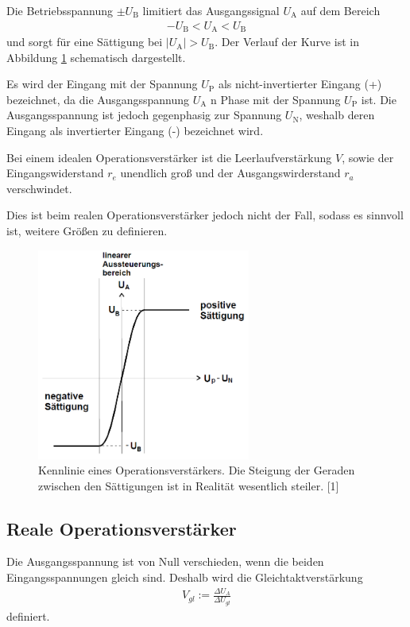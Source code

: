 \documentclass[]{scrartcl}
\begin{document}
Die Betriebsspannung $\pm U_{\text{B}}$ limitiert das Ausgangssignal $U_{\text{A}}$ auf dem Bereich
\begin{align}
 -U_{\text{B}} < U_{\text{A}} < U_{\text{B}}
\end{align}
und sorgt für eine Sättigung bei $\left| U_{\text{A}} \right| > U_{\text{B}}$. Der Verlauf der Kurve ist in Abbildung \ref{fig:kennlinie_operationsverstaerker} schematisch dargestellt. 

Es wird der Eingang mit der Spannung $U_{\text{P}}$ als nicht-invertierter Eingang (+) bezeichnet, da die Ausgangsspannung $U_{\text{A}}$ n Phase mit der Spannung $U_{\text{P}}$ ist.
Die Ausgangsspannung ist jedoch gegenphasig zur Spannung $U_{\text{N}}$, weshalb deren Eingang als invertierter Eingang (-) bezeichnet wird.

Bei einem idealen Operationsverstärker ist die Leerlaufverstärkung $V$, sowie der Eingangswiderstand $r_{e}$ unendlich groß und der Ausgangswirderstand $r_a$ verschwindet.

Dies ist beim realen Operationsverstärker jedoch nicht der Fall, sodass es sinnvoll ist, weitere Größen zu definieren.

\begin{figure}[H]
\centering
\includegraphics[width=7cm]{images/kennlinie_operationsverstaerker.png}
\caption{Kennlinie eines Operationsverstärkers. Die Steigung der Geraden zwischen den Sättigungen ist in Realität wesentlich steiler. [1]}
\label{fig:kennlinie_operationsverstaerker}
\end{figure}

\subsection{Reale Operationsverstärker}
Die Ausgangsspannung ist von Null verschieden, wenn die beiden Eingangsspannungen gleich sind. Deshalb wird die Gleichtaktverstärkung
\begin{align}
 V_{gl}:=\frac{\Delta U_{A}}{\Delta U_{gl}}
\end{align}
definiert.
\end{document}
